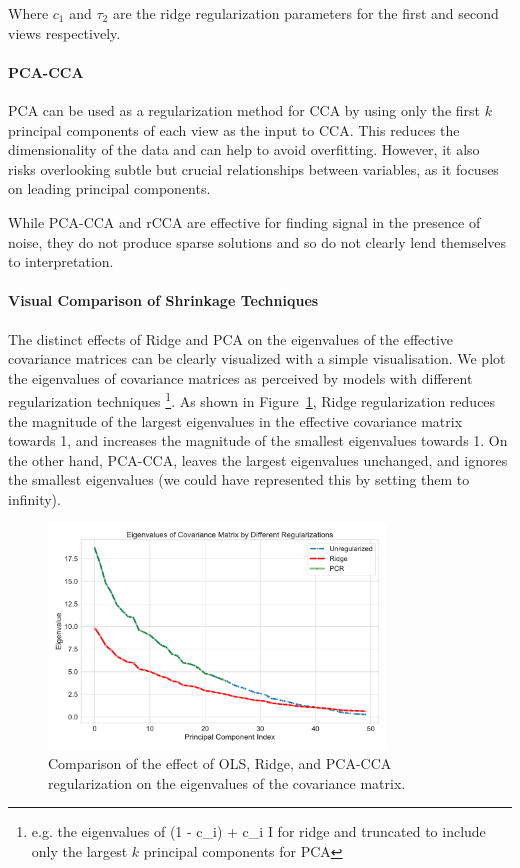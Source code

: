 Where $c_1$ and $\tau_2$ are the ridge regularization parameters for the first and second views respectively.

\paragraph{PCA-CCA} PCA can be used as a regularization method for CCA by using only the first \( k \) principal components of each view as the input to CCA.
This reduces the dimensionality of the data and can help to avoid overfitting.
However, it also risks overlooking subtle but crucial relationships between variables, as it focuses on leading principal components.

While PCA-CCA and rCCA are effective for finding signal in the presence of noise, they do not produce sparse
solutions and so do not clearly lend themselves to interpretation.

\paragraph{Visual Comparison of Shrinkage Techniques}

The distinct effects of Ridge and PCA on the eigenvalues of the effective covariance matrices can be clearly visualized with a simple visualisation.
We plot the eigenvalues of covariance matrices as perceived by models with different regularization techniques \footnote{e.g. the eigenvalues of (1 - c_i)  + c_i I for ridge and  truncated to include only the largest $k$ principal components for PCA}.
As shown in Figure~\ref{fig:shrinkage}, Ridge regularization reduces the magnitude of the largest eigenvalues in the effective covariance matrix towards 1, and increases the magnitude of the smallest eigenvalues towards 1.
On the other hand, PCA-CCA, leaves the largest eigenvalues unchanged, and ignores the smallest eigenvalues (we could have represented this by setting them to infinity).

\begin{figure}
    \centering
    \includegraphics[width=0.8\textwidth]{figures/shrinkage/shrinkage}
    \caption{Comparison of the effect of OLS, Ridge, and PCA-CCA regularization on the eigenvalues of the covariance matrix.}\label{fig:shrinkage}
\end{figure}

